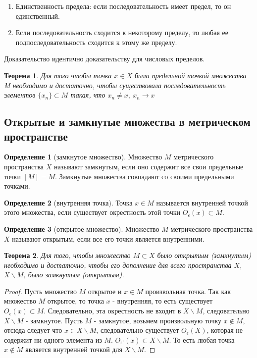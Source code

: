 \documentclass[14pt,a4paper]{extarticle}
\newtheorem{theorem}{Теорема}[section]
\theoremstyle{definition}
\newtheorem{definition}{Определение}[section]
\theoremstyle{remark}
\renewcommand{\[}{\begin{dmath*}[compact]}
\renewcommand{\]}{\end{dmath*}}
\newcommand{\be}{\begin{enumerate}}
\newcommand{\ee}{\end{enumerate}}
\newcommand{\sep}{ , \ \allowbreak }
\begin{document}
\be
  \item Единственность предела: если последовательность имеет предел,
  то он единственный.

  \item Если последовательность сходится к некоторому пределу,
  то любая ее подпоследовательность сходится к этому же пределу.
\ee

Доказательство идентично доказательству для числовых пределов.

\begin{theorem}
  Для того чтобы точка $x \in X$ была предельной точкой множества M
  необходимо и достаточно, чтобы существовала последовательность элементов
  $\{x_n\}\subset M$ такая, что $x_n\neq x \sep x_n\to x$
\end{theorem}

\subsection{Открытые и замкнутые множества в метрическом пространстве}

\begin{definition}[замкнутое множество]
  Множество $M$ метрического пространства $X$ называют замкнутым,
  если оно содержит все свои предельные точки $[M]=M$.
  Замкнутые множества совпадают со своими предельными точками.
\end{definition}

\begin{definition}[внутренняя точка]
  Точка $x \in M$ называется внутренней точкой этого множества,
  если существует окрестность этой точки $O_\epsilon(x)\subset M$.
\end{definition}

\begin{definition}[открытое множество]
  Множество $M$ метрического пространства $X$ называют открытым,
  если все его точки является внутренними.
\end{definition}

\begin{theorem}
  Для того, чтобы множество $M \subset X$ было открытым (замкнутым)
  необходимо и достаточно, чтобы его дополнение для всего пространства $X$,
  $X \backslash M$, было замкнутым (открытым).
\end{theorem}

\begin{proof}
  Пусть множество $M$ открытое и $x \in M$ произвольная точка.
  Так как множество $M$ открытое, то точка $x$ - внутренняя, то есть существует
  $O_\epsilon(x)\subset M$. Следовательно, эта окрестность не входит в
  $X \backslash M$, следовательно $X \backslash M$ - замкнутое.
  Пусть $M$ - замкнутое, возьмем произвольную точку $x \notin M$, отсюда следует
  что $x\in X\backslash M$, следовательно существует $O_{\epsilon}(X)$, которая
  не содержит ни одного элемента из $M$.
  $O_{\epsilon'}(x)\subset X\backslash M$.
  То есть любая точка $x \notin M$ является внутренней точкой для
  $X \backslash M$.
\end{proof}
\end{document}
